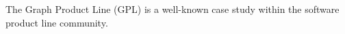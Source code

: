 
The Graph Product Line (GPL) is a well-known case study within the software product line community.

